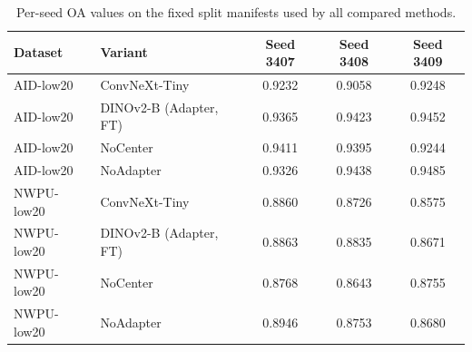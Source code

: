 \begin{table}[t]
  \centering
  \caption{Per-seed OA values on the fixed split manifests used by all compared methods.}
  \label{tab:seedwise_results}
  \begin{tabular}{l l c c c}
    \toprule
    Dataset & Variant & Seed 3407 & Seed 3408 & Seed 3409 \\
    \midrule
    AID-low20 & ConvNeXt-Tiny & 0.9232 & 0.9058 & 0.9248 \\
    AID-low20 & DINOv2-B (Adapter, FT) & 0.9365 & 0.9423 & 0.9452 \\
    AID-low20 & NoCenter & 0.9411 & 0.9395 & 0.9244 \\
    AID-low20 & NoAdapter & 0.9326 & 0.9438 & 0.9485 \\
    NWPU-low20 & ConvNeXt-Tiny & 0.8860 & 0.8726 & 0.8575 \\
    NWPU-low20 & DINOv2-B (Adapter, FT) & 0.8863 & 0.8835 & 0.8671 \\
    NWPU-low20 & NoCenter & 0.8768 & 0.8643 & 0.8755 \\
    NWPU-low20 & NoAdapter & 0.8946 & 0.8753 & 0.8680 \\
    \bottomrule
  \end{tabular}
\end{table}
